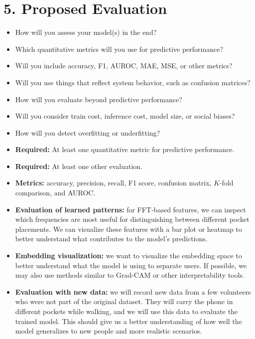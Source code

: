 \documentclass[11pt]{article}
\begin{document}
\section{5. Proposed Evaluation}
\begin{itemize}
    \item How will you assess your model(s) in the end?
    \item Which quantitative metrics will you use for predictive performance?
    \item Will you include accuracy, F1, AUROC, MAE, MSE, or other metrics?
    \item Will you use things that reflect system behavior, such as confusion matrices?
    \item How will you evaluate beyond predictive performance?
    \item Will you consider train cost, inference cost, model size, or social biases?
    \item How will you detect overfitting or underfitting?
    \item \textbf{Required:} At least one quantitative metric for predictive performance.
    \item \textbf{Required:} At least one other evaluation.
\end{itemize}

\begin{itemize}
    \item \textbf{Metrics:} accuracy, precision, recall, F1 score, confusion matrix, $K$-fold comparison, and AUROC.
    \item \textbf{Evaluation of learned patterns:} for FFT-based features, we can inspect which frequencies are most useful for distinguishing between different pocket placements. We can visualize these features with a bar plot or heatmap to better understand what contributes to the model's predictions.
    \item \textbf{Embedding visualization:} we want to visualize the embedding space to better understand what the model is using to separate users. If possible, we may also use methods similar to Grad-CAM or other interpretability tools.
    \item \textbf{Evaluation with new data:} we will record new data from a few volunteers who were not part of the original dataset. They will carry the phone in different pockets while walking, and we will use this data to evaluate the trained model. This should give us a better understanding of how well the model generalizes to new people and more realistic scenarios.
\end{itemize}
\end{document}
